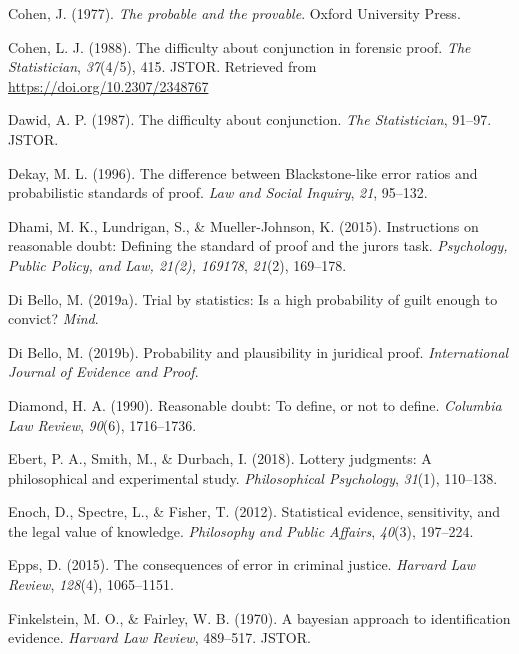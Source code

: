 \documentclass[10pt,dvipsnames,enabledeprecatedfontcommands]{scrartcl}
\begin{document}
\hypertarget{ref-Cohen1977The-probable-an}{}
Cohen, J. (1977). \emph{The probable and the provable}. Oxford
University Press.

\hypertarget{ref-cohen1988difficulty}{}
Cohen, L. J. (1988). The difficulty about conjunction in forensic proof.
\emph{The Statistician}, \emph{37}(4/5), 415. JSTOR. Retrieved from
\url{https://doi.org/10.2307/2348767}

\hypertarget{ref-dawid1987difficulty}{}
Dawid, A. P. (1987). The difficulty about conjunction. \emph{The
Statistician}, 91--97. JSTOR.

\hypertarget{ref-Dekay1996}{}
Dekay, M. L. (1996). The difference between Blackstone-like error ratios
and probabilistic standards of proof. \emph{Law and Social Inquiry},
\emph{21}, 95--132.

\hypertarget{ref-dhamiEtAl2015}{}
Dhami, M. K., Lundrigan, S., \& Mueller-Johnson, K. (2015). Instructions
on reasonable doubt: Defining the standard of proof and the jurors task.
\emph{Psychology, Public Policy, and Law, 21(2), 169178}, \emph{21}(2),
169--178.

\hypertarget{ref-diBello2019}{}
Di Bello, M. (2019a). Trial by statistics: Is a high probability of
guilt enough to convict? \emph{Mind}.

\hypertarget{ref-DiBello2019plausibility}{}
Di Bello, M. (2019b). Probability and plausibility in juridical proof.
\emph{International Journal of Evidence and Proof}.

\hypertarget{ref-diamond90}{}
Diamond, H. A. (1990). Reasonable doubt: To define, or not to define.
\emph{Columbia Law Review}, \emph{90}(6), 1716--1736.

\hypertarget{ref-ebert2018}{}
Ebert, P. A., Smith, M., \& Durbach, I. (2018). Lottery judgments: A
philosophical and experimental study. \emph{Philosophical Psychology},
\emph{31}(1), 110--138.

\hypertarget{ref-Enoch2012Statistical}{}
Enoch, D., Spectre, L., \& Fisher, T. (2012). Statistical evidence,
sensitivity, and the legal value of knowledge. \emph{Philosophy and
Public Affairs}, \emph{40}(3), 197--224.

\hypertarget{ref-epps2015}{}
Epps, D. (2015). The consequences of error in criminal justice.
\emph{Harvard Law Review}, \emph{128}(4), 1065--1151.

\hypertarget{ref-finkelstein1970bayesian}{}
Finkelstein, M. O., \& Fairley, W. B. (1970). A bayesian approach to
identification evidence. \emph{Harvard Law Review}, 489--517. JSTOR.
\end{document}
